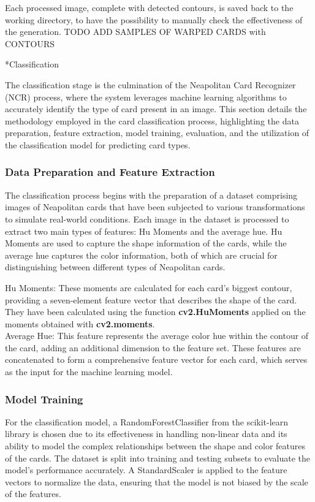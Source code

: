 \documentclass[twocolumn, a4paper,10pt]{article}
\makeatletter
\renewcommand\subsection{\@startsection{subsection}{1}{\z@}{\z@}{\z@}{\normalfont\normalsize\bfseries}}
\renewcommand\subsection{\@startsection{subsection}{1}{\z@}{\z@}{0.1pt}{\normalfont\normalsize\bfseries}}
\makeatother
\begin{document}
Each processed image, complete with detected contours, is saved back to the working directory, to have the possibility to manually check the effectiveness of the generation.
TODO ADD SAMPLES OF WARPED CARDS with CONTOURS


\subsection*{Classification}

The classification stage is the culmination of the Neapolitan Card Recognizer (NCR) process, where the system leverages machine learning algorithms to accurately identify the type of card present in an image. This section details the methodology employed in the card classification process, highlighting the data preparation, feature extraction, model training, evaluation, and the utilization of the classification model for predicting card types.

\subsubsection*{Data Preparation and Feature Extraction}
The classification process begins with the preparation of a dataset comprising images of Neapolitan cards that have been subjected to various transformations to simulate real-world conditions. Each image in the dataset is processed to extract two main types of features: Hu Moments and the average hue. Hu Moments are used to capture the shape information of the cards, while the average hue captures the color information, both of which are crucial for distinguishing between different types of Neapolitan cards.

Hu Moments: These moments are calculated for each card's biggest contour, providing a seven-element feature vector that describes the shape of the card. They have been calculated using the function \textbf{cv2.HuMoments} applied on the moments obtained with \textbf{cv2.moments}.\\

Average Hue: This feature represents the average color hue within the contour of the card, adding an additional dimension to the feature set.
These features are concatenated to form a comprehensive feature vector for each card, which serves as the input for the machine learning model.

\subsubsection*{Model Training}
For the classification model, a RandomForestClassifier from the scikit-learn library is chosen due to its effectiveness in handling non-linear data and its ability to model the complex relationships between the shape and color features of the cards. The dataset is split into training and testing subsets to evaluate the model's performance accurately. A StandardScaler is applied to the feature vectors to normalize the data, ensuring that the model is not biased by the scale of the features.
\end{document}
